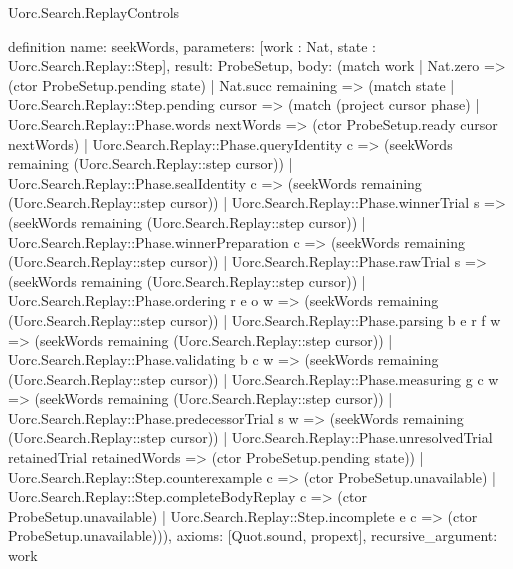 \begin{lexlean}{Uorc.Search.ReplayControls}
\begin{semanticmodule}
definition{
  name: seekWords,
  parameters: [work : Nat, state : Uorc.Search.Replay::Step],
  result: ProbeSetup,
  body: (match work
    | Nat.zero => (ctor ProbeSetup.pending state)
    | Nat.succ remaining => (match state
      | Uorc.Search.Replay::Step.pending cursor => (match (project cursor phase)
        | Uorc.Search.Replay::Phase.words nextWords => (ctor ProbeSetup.ready cursor nextWords)
        | Uorc.Search.Replay::Phase.queryIdentity c => (seekWords remaining (Uorc.Search.Replay::step cursor))
        | Uorc.Search.Replay::Phase.sealIdentity c => (seekWords remaining (Uorc.Search.Replay::step cursor))
        | Uorc.Search.Replay::Phase.winnerTrial s => (seekWords remaining (Uorc.Search.Replay::step cursor))
        | Uorc.Search.Replay::Phase.winnerPreparation c => (seekWords remaining (Uorc.Search.Replay::step cursor))
        | Uorc.Search.Replay::Phase.rawTrial s => (seekWords remaining (Uorc.Search.Replay::step cursor))
        | Uorc.Search.Replay::Phase.ordering r e o w => (seekWords remaining (Uorc.Search.Replay::step cursor))
        | Uorc.Search.Replay::Phase.parsing b e r f w => (seekWords remaining (Uorc.Search.Replay::step cursor))
        | Uorc.Search.Replay::Phase.validating b c w => (seekWords remaining (Uorc.Search.Replay::step cursor))
        | Uorc.Search.Replay::Phase.measuring g c w => (seekWords remaining (Uorc.Search.Replay::step cursor))
        | Uorc.Search.Replay::Phase.predecessorTrial s w => (seekWords remaining (Uorc.Search.Replay::step cursor))
        | Uorc.Search.Replay::Phase.unresolvedTrial retainedTrial retainedWords => (ctor ProbeSetup.pending state))
      | Uorc.Search.Replay::Step.counterexample c => (ctor ProbeSetup.unavailable)
      | Uorc.Search.Replay::Step.completeBodyReplay c => (ctor ProbeSetup.unavailable)
      | Uorc.Search.Replay::Step.incomplete e c => (ctor ProbeSetup.unavailable))),
  axioms: [Quot.sound, propext],
  recursive_argument: work
}


\end{semanticmodule}
\end{lexlean}
